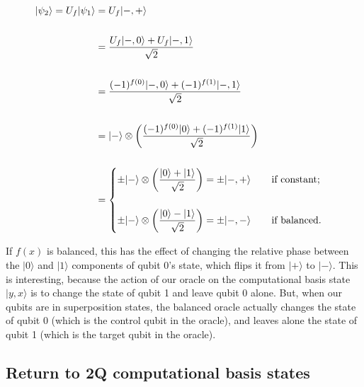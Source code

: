 \documentclass[12pt, letterpaper]{article}
\begin{document}
\begin{equation}
\begin{split}
|\psi_2\rangle = U_f|\psi_1\rangle
&= U_f|-, +\rangle \\
\vspace{1 mm}\\
&= \dfrac{U_f|-, 0\rangle + U_f|-, 1\rangle}{\sqrt{2}} \\
\vspace{1 mm}\\
&= \dfrac{(-1)^{f(0)}|-, 0\rangle + (-1)^{f(1)}|-, 1\rangle}{\sqrt{2}} \\
\vspace{1 mm}\\
&= |-\rangle \otimes \left( \dfrac{(-1)^{f(0)}|0\rangle + (-1)^{f(1)}|1\rangle}{\sqrt{2}}\right) \\
\vspace{1 mm}\\
&= \begin{cases}
   \pm |-\rangle \otimes \left( \dfrac{|0\rangle + |1\rangle}{\sqrt{2}}\right) = \pm |-,+\rangle \text{ \hspace{5 mm} if constant;} \\
   \vspace{1 mm}\\
   \pm |-\rangle \otimes \left( \dfrac{|0\rangle - |1\rangle}{\sqrt{2}}\right) = \pm |-,-\rangle \text{ \hspace{5 mm} if balanced.}
\end{cases}
\end{split}
\end{equation}
\vspace{1 mm}

\noindent
If $f(x)$ is balanced, this has the effect of changing the relative phase between the $|0\rangle$ and $|1\rangle$ components of qubit 0's state, which flips it from $|+\rangle$ to $|-\rangle$. This is interesting, because the action of our oracle on the computational basis state $|y,x\rangle$ is to change the state of qubit 1 and leave qubit 0 alone. But, when our qubits are in superposition states, the balanced oracle actually changes the state of qubit 0 (which is the control qubit in the oracle), and leaves alone the state of qubit 1 (which is the target qubit in the oracle).

\subsection{Return to 2Q computational basis states}
\end{document}
